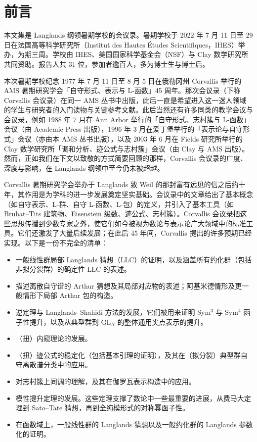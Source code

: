 \chapter*{前言}

本文集是 Langlands 纲领暑期学校的会议录。暑期学校于 2022 年 7 月 11 日至 29 日在法国高等科学研究所（Institut des Hautes Études Scientifiques，IHES）举办，为期三周。学校由 IHES、美国国家科学基金会（NSF）与 Clay 数学研究所共同资助。报告人共 31 位，参加者逾百人，多为博士生与博士后。

本次暑期学校纪念 1977 年 7 月 11 日至 8 月 5 日在俄勒冈州 Corvallis 举行的 AMS 暑期研究学会「自守形式、表示与 L-函数」45 周年。那次会议录（下称 Corvallis 会议录）在同一 AMS 丛书中出版，此后一直是希望进入这一迷人领域的学生与研究者的入门读物与关键参考文献。此后当然还有许多同类的教学会议与会议录，例如 1988 年 7 月在 Ann Arbor 举行的「自守形式、志村簇与 L-函数」会议（由 Academic Press 出版），1996 年 3 月在爱丁堡举行的「表示论与自守形式」会议（亦由本 AMS 丛书出版），以及 2003 年 6 月在 Fields 研究所举行的 Clay 数学研究所「调和分析、迹公式与志村簇」会议（由 Clay 与 AMS 出版）。然而，正如我们在下文以致敬的方式简要回顾的那样，Corvallis 会议录的广度、深度与影响，在 Langlands 纲领中至今仍未被超越。

Corvallis 暑期研究学会举办于 Langlands 致 Weil 的那封富有远见的信之后约十年，其作用是为学科的进一步发展奠定坚实基础。会议录中的文章给出了基本概念（如自守表示、L-群、自守 L-函数、L-包）的定义，并引入了基本工具（如 Bruhat–Tits 建筑物、Eisenstein 级数、迹公式、志村簇）。Corvallis 会议录把这些思想传播到少数专家之外，使它们如今被视为数论与表示论广大领域中的标准工具。它们还激发了大量后续发展；在此后 45 年间，Corvallis 提出的许多预期已经实现。以下是一份不完全的清单：

\begin{itemize}[leftmargin=2em,itemsep=0.15em]
\item 一般线性群局部 Langlands 猜想（LLC）的证明，以及涵盖所有约化群（包括非拟分裂群）的确定性 LLC 的表述。
\item 描述离散自守谱的 Arthur 猜想及其局部对应物的表述；阿基米德情形及更一般情形下局部 Arthur 包的构造。
\item 逆定理与 Langlands–Shahidi 方法的发展，它们被用来证明 Sym$^3$ 与 Sym$^4$ 函子性提升，以及从典型群到 $\mathrm{GL}_N$ 的整体通用尖点表示的提升。
\item （扭）内窥理论的发展。
\item （扭）迹公式的稳定化（包括基本引理的证明），及其在（拟分裂）典型群自守离散谱分类中的应用。
\item 对志村簇上同调的理解，及其在伽罗瓦表示构造中的应用。
\item 模性提升定理的发展。这些定理支撑了数论中一些最重要的进展，从费马大定理到 Sato–Tate 猜想，再到全纯模形式的对称幂函子性。
\item 在函数域上，一般线性群的 Langlands 猜想以及一般约化群的 Langlands 参数化的证明。
\end{itemize}


